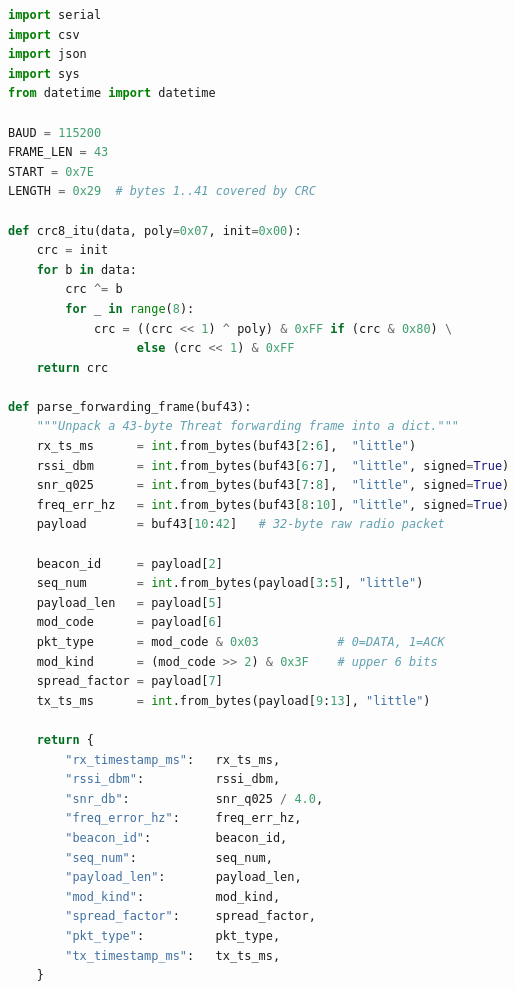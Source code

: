 \documentclass[11pt,letterpaper]{article}
\begin{document}
\begin{lstlisting}[language=Python, caption={Collection script skeleton (\texttt{collect.py}).}]
import serial
import csv
import json
import sys
from datetime import datetime

BAUD = 115200
FRAME_LEN = 43
START = 0x7E
LENGTH = 0x29  # bytes 1..41 covered by CRC

def crc8_itu(data, poly=0x07, init=0x00):
    crc = init
    for b in data:
        crc ^= b
        for _ in range(8):
            crc = ((crc << 1) ^ poly) & 0xFF if (crc & 0x80) \
                  else (crc << 1) & 0xFF
    return crc

def parse_forwarding_frame(buf43):
    """Unpack a 43-byte Threat forwarding frame into a dict."""
    rx_ts_ms      = int.from_bytes(buf43[2:6],  "little")
    rssi_dbm      = int.from_bytes(buf43[6:7],  "little", signed=True)
    snr_q025      = int.from_bytes(buf43[7:8],  "little", signed=True)
    freq_err_hz   = int.from_bytes(buf43[8:10], "little", signed=True)
    payload       = buf43[10:42]   # 32-byte raw radio packet

    beacon_id     = payload[2]
    seq_num       = int.from_bytes(payload[3:5], "little")
    payload_len   = payload[5]
    mod_code      = payload[6]
    pkt_type      = mod_code & 0x03           # 0=DATA, 1=ACK
    mod_kind      = (mod_code >> 2) & 0x3F    # upper 6 bits
    spread_factor = payload[7]
    tx_ts_ms      = int.from_bytes(payload[9:13], "little")

    return {
        "rx_timestamp_ms":   rx_ts_ms,
        "rssi_dbm":          rssi_dbm,
        "snr_db":            snr_q025 / 4.0,
        "freq_error_hz":     freq_err_hz,
        "beacon_id":         beacon_id,
        "seq_num":           seq_num,
        "payload_len":       payload_len,
        "mod_kind":          mod_kind,
        "spread_factor":     spread_factor,
        "pkt_type":          pkt_type,
        "tx_timestamp_ms":   tx_ts_ms,
    }


\end{lstlisting}
\end{document}
